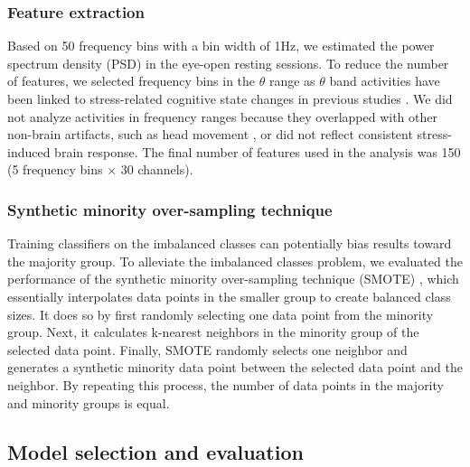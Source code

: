 \documentclass[journal]{IEEEtran}
\begin{document}
\subsubsection{Feature extraction}
Based on 50 frequency bins with a bin width of 1Hz, we estimated the power spectrum density (PSD) in the eye-open resting sessions.
To reduce the number of features, we selected frequency bins in the $\theta$ range as $\theta$ band activities have been linked to stress-related cognitive state changes in previous studies \cite{sani2014stress_detection_power, alonso2015stress_theta_increase}.
We did not analyze activities in frequency ranges because they overlapped with other non-brain artifacts, such as head movement \cite{goncharova2003emg_freq_range}, or did not reflect consistent stress-induced brain response.
The final number of features used in the analysis was 150 (5 frequency bins $\times$ 30 channels).

\subsubsection{Synthetic minority over-sampling technique}
Training classifiers on the imbalanced classes can potentially bias results toward the majority group.
To alleviate the imbalanced classes problem, we evaluated the performance of the synthetic minority over-sampling technique (SMOTE) \cite{chawla2002smote}, which essentially interpolates data points in the smaller group to create balanced class sizes.
It does so by first randomly selecting one data point from the minority group.
Next, it calculates k-nearest neighbors in the minority group of the selected data point.
Finally, SMOTE randomly selects one neighbor and generates a synthetic minority data point between the selected data point and the neighbor.
By repeating this process, the number of data points in the majority and minority groups is equal.

\subsection{Model selection and evaluation}
\end{document}
